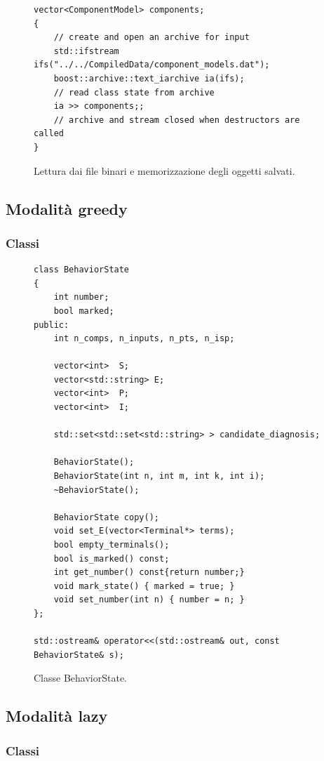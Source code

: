 \begin{figure}[htbp]
\begin{verbatim}
vector<ComponentModel> components;
{
    // create and open an archive for input
    std::ifstream ifs("../../CompiledData/component_models.dat");
    boost::archive::text_iarchive ia(ifs);
    // read class state from archive
    ia >> components;;
    // archive and stream closed when destructors are called
}
\end{verbatim}
\caption{Lettura dai file binari e memorizzazione degli oggetti salvati.}
\label{code:read_files}
\end{figure}

\subsection{Modalità greedy}

\subsubsection{Classi}

\begin{figure}[htbp]
\begin{verbatim}
class BehaviorState
{
    int number;
    bool marked;
public:
    int n_comps, n_inputs, n_pts, n_isp;

    vector<int>  S;
    vector<std::string> E;
    vector<int>  P;
    vector<int>  I;

    std::set<std::set<std::string> > candidate_diagnosis;

    BehaviorState();
    BehaviorState(int n, int m, int k, int i);
    ~BehaviorState();

    BehaviorState copy();
    void set_E(vector<Terminal*> terms);
    bool empty_terminals();
    bool is_marked() const;
    int get_number() const{return number;}
    void mark_state() { marked = true; }
    void set_number(int n) { number = n; }
};

std::ostream& operator<<(std::ostream& out, const BehaviorState& s);
\end{verbatim}
\caption{Classe BehaviorState.}
\label{code:greedy_bhvstate}
\end{figure}


\subsection{Modalità lazy}

\subsubsection{Classi}

